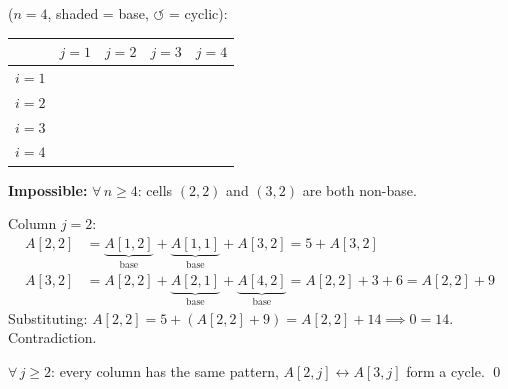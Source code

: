\documentclass[11pt]{article}
\newcommand{\bc}[1]{\cellcolor{gray!20}{#1}}
\newcommand{\pc}[1]{\cellcolor{red!15}{#1}}
\begin{document}
($n = 4$, \colorbox{gray!20}{shaded} = base, \colorbox{red!15}{$\circlearrowleft$} = cyclic):

\begin{center}
\renewcommand{\arraystretch}{1.3}
\begin{tabular}{c|cccc}
 & $j{=}1$ & $j{=}2$ & $j{=}3$ & $j{=}4$ \\ \hline
$i{=}1$ & \bc{$2$} & \bc{$3$} & \bc{$4$} & \bc{$5$} \\
$i{=}2$ & \bc{$3$} & \pc{$\circlearrowleft$} & \pc{$\circlearrowleft$} & \pc{$\circlearrowleft$} \\
$i{=}3$ & \bc{$4$} & \pc{$\circlearrowleft$} & \pc{$\circlearrowleft$} & \pc{$\circlearrowleft$} \\
$i{=}4$ & \bc{$5$} & \bc{$6$} & \bc{$7$} & \bc{$8$}
\end{tabular}
\end{center}

\textbf{Impossible:}
$\forall\, n \ge 4$: cells $(2, 2)$ and $(3, 2)$ are both non-base.

Column $j = 2$:
\begin{align*}
A[2, 2] &= \underbrace{A[1, 2]}_{\text{base}} + \underbrace{A[1, 1]}_{\text{base}} + A[3, 2] = 5 + A[3,2] \\
A[3, 2] &= A[2, 2] + \underbrace{A[2, 1]}_{\text{base}} + \underbrace{A[4, 2]}_{\text{base}} = A[2, 2] + 3 + 6 = A[2, 2] + 9
\end{align*}
Substituting: $A[2,2] = 5 + (A[2,2] + 9) = A[2,2] + 14 \implies 0 = 14$. \; Contradiction.

$\forall\, j \ge 2$: every column has the same pattern, $A[2,j] \leftrightarrow A[3,j]$ form a cycle. \qed
\end{document}
